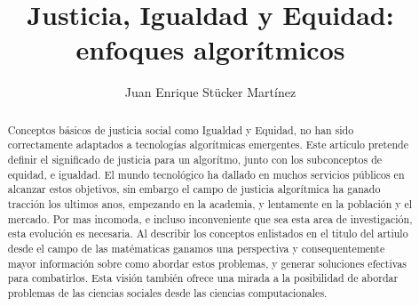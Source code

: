 \documentclass[acmlarge]{acmart}
\begin{document}
\title{Justicia, Igualdad y Equidad: enfoques algorítmicos}

\author{Juan Enrique Stücker Martínez}

%

\begin{abstract}
  Conceptos básicos de justicia social como Igualdad y Equidad, no han sido correctamente adaptados a tecnologías algorítmicas emergentes. Este artículo pretende definir el significado de justicia para un algorítmo, junto con los subconceptos de equidad, e igualdad. El mundo tecnológico ha dallado en muchos servicios públicos en alcanzar estos objetivos, sin embargo el campo de justicia algorítmica ha ganado tracción los ultimos anos, empezando en la academia, y lentamente en la población y el mercado.
  Por mas incomoda, e incluso inconveniente que sea esta area de investigación, esta evolución es necesaria.
  Al describir los conceptos enlistados en el titulo del artiulo desde el campo de las matématicas ganamos una perspectiva y consequentemente mayor información sobre como abordar estos problemas, y generar soluciones efectivas para combatirlos. Esta visión también ofrece una mirada a la posibilidad de abordar problemas de las ciencias sociales desde las ciencias computacionales.

\end{abstract}



\maketitle

\renewcommand{\shortauthors}{}

\graphicspath{{../figures/}}





\end{document}

